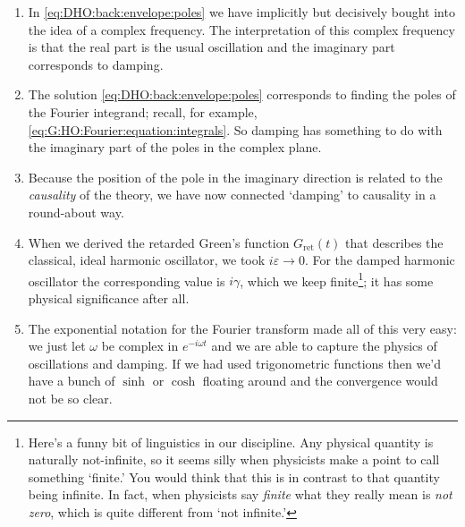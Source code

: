  \begin{enumerate}
 \item In \eqref{eq:DHO:back:envelope:poles} we have implicitly but decisively bought into the idea of a complex frequency. The interpretation of this complex frequency is that the real part is the usual oscillation and the imaginary part corresponds to damping.

 \item The solution \eqref{eq:DHO:back:envelope:poles} corresponds to finding the poles of the Fourier integrand; recall, for example, \eqref{eq:G:HO:Fourier:equation:integrals}. So damping has something to do with the imaginary part of the poles in the complex plane.

 \item Because the position of the pole in the imaginary direction is related to the \emph{causality} of the theory, we have now connected `damping' to causality in a round-about way.

 \item When we derived the retarded Green's function $G_\text{ret}(t)$ that describes the classical, ideal harmonic oscillator, we took $i\varepsilon\to 0$. For the damped harmonic oscillator the corresponding value is $i\gamma$, which we keep finite\footnote{Here's a funny bit of linguistics in our discipline. Any physical quantity is naturally not-infinite, so it seems silly when physicists make a point to call something `finite.' You would think that this is in contrast to that quantity being infinite. In fact, when physicists say \emph{finite} what they really mean is \emph{not zero}, which is quite different from `not infinite.'}; it has some physical significance after all.

 \item The exponential notation for the Fourier transform made all of this very easy: we just let $\omega$ be complex in $e^{-i\omega t}$ and we are able to capture the physics of oscillations and damping. If we had used trigonometric functions then we'd have a bunch of $\sinh$ or $\cosh$ floating around and the convergence would not be so clear.
 \end{enumerate}
 
